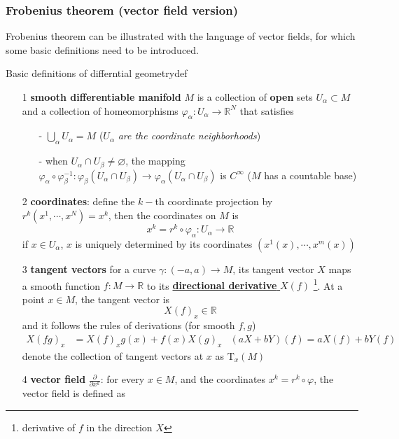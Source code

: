 \subsubsection*{Frobenius theorem (vector field version)}
Frobenius theorem can be illustrated with the language of vector fields, for which some basic definitions need to be introduced.

\begin{definition}{Basic definitions of differntial geometry}{def}
    \begin{enumerate}
        \item[1] \textbf{smooth differentiable manifold} $M$ is a collection of \textbf{open} sets $U_{\alpha}\subset M$ and a collection of homeomorphisms $\varphi_{\alpha}:U_{\alpha}\rightarrow\mathbb{R}^N$ that satisfies
        \begin{enumerate}
            \item[-] $\bigcup_{\alpha}U_{\alpha}=M$ {(\color{red!55!black}$U_{\alpha}$\textit{ are the coordinate neighborhoods})}
            \item[-] when $U_{\alpha}\cap U_{\beta}\neq \varnothing$, the mapping $\varphi_{\alpha}\circ \varphi_{\beta}^{-1}:\varphi_{\beta}(U_{\alpha}\cap U_{\beta})\rightarrow \varphi_{\alpha}(U_{\alpha}\cap U_{\beta})$ is $C^{\infty}$ {\color{red!55!black}($M$ has a countable base)}
        \end{enumerate}
        \item[2] \textbf{coordinates}: define the $k-$th coordinate projection by $r^k\left(x^1,\cdots,x^N\right)=x^k$, then the coordinates on $M$ is 
        $$
        x^k = r^k\circ \varphi_{\alpha}: U_{\alpha}\rightarrow \mathbb{R}
        $$
        if $x\in U_{\alpha}$, $x$ is uniquely determined by its coordinates $\left(x^1(x),\cdots,x^m(x)\right)$
        \item[3] \textbf{tangent vectors} for a curve $\gamma:(-a,a)\rightarrow M$, its tangent vector $X$ maps a smooth function $f:M\rightarrow \mathbb{R}$ to its \underline{\textbf{directional derivative} $X(f)$} \footnote{derivative of $f$ in the direction $X$}. At a point $x\in M$, the tangent vector is $$ X(f)_x\in \mathbb{R} $$ and it follows the rules of derivations (for smooth $f,g$)
        \begin{align*}
            X(fg)_x&=X(f)_xg(x)+f(x)X(g)_x & (aX+bY)(f)=aX(f)+bY(f)
        \end{align*} 
        denote the collection of tangent vectors at $x$ as $\mathrm{T}_x(M)$
        \item[4] \textbf{vector field} $\frac{\partial}{\partial x^k}$: for every $x\in M$, and the coordinates $x^k = r^k\circ \varphi$, the vector field is defined as

\end{enumerate}
\end{definition}
